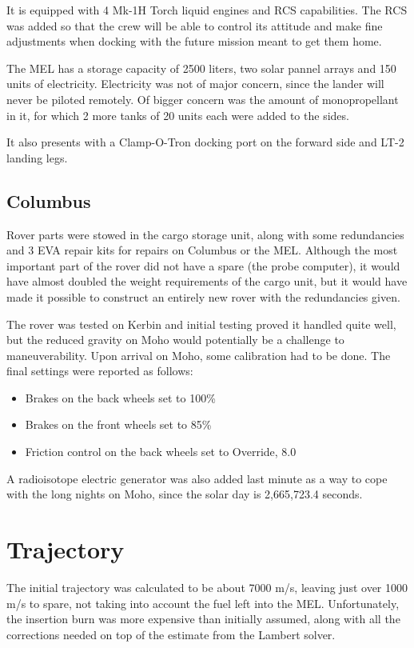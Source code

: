 \documentclass[11pt, a4paper]{article}
\begin{document}
It is equipped with 4 Mk-1H Torch liquid engines and RCS
capabilities. The RCS was added so that the crew will be able to
control its attitude and make fine adjustments when docking with the
future mission meant to get them home.

The MEL has a storage capacity of 2500 liters, two solar pannel arrays
and 150 units of electricity. Electricity was not of major concern,
since the lander will never be piloted remotely. Of bigger concern was
the amount of monopropellant in it, for which 2 more tanks of 20 units
each were added to the sides.

It also presents with a Clamp-O-Tron docking port on the forward side
and LT-2 landing legs.

\subsection{Columbus}
Rover parts were stowed in the cargo storage unit, along with some
redundancies and 3 EVA repair kits for repairs on Columbus or the
MEL. Although the most important part of the rover did not have a
spare (the probe computer), it would have almost doubled the weight
requirements of the cargo unit, but it would have made it possible to
construct an entirely new rover with the redundancies given.

The rover was tested on Kerbin and initial testing proved it
handled quite well, but the reduced gravity on Moho would potentially
be a challenge to maneuverability. Upon arrival on Moho, some
calibration had to be done. The final settings were reported as
follows:
\begin{itemize}
\item Brakes on the back wheels set to 100\%
\item Brakes on the front wheels set to 85\%
\item Friction control on the back wheels set to Override, 8.0
\end{itemize}

A radioisotope electric generator was also added last minute as a way
to cope with the long nights on Moho, since the solar day is 2,665,723.4 seconds.
  
\section{Trajectory}
The initial trajectory was calculated to be about 7000 m/s, leaving
just over 1000 m/s to spare, not taking into account the fuel left
into the MEL. Unfortunately, the insertion burn was more expensive
than initially assumed, along with all the corrections needed on top
of the estimate from the Lambert solver.
\end{document}
